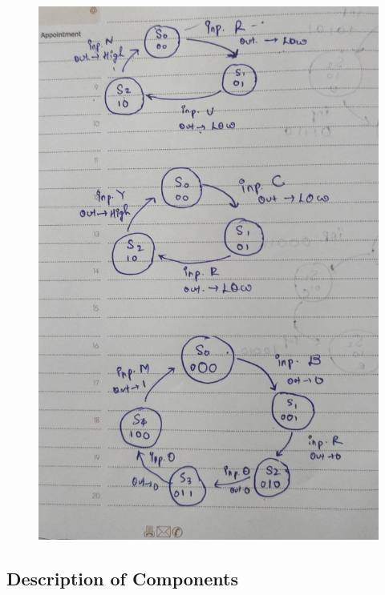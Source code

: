 \documentclass[12pt]{article}
\begin{document}
\begin{figure}[H]
\centering
  \includegraphics[scale=0.3]{Images/StringDet_Design.jpeg}
  \caption{}
\end{figure}

\subsection{Description of Components}
\end{document}
